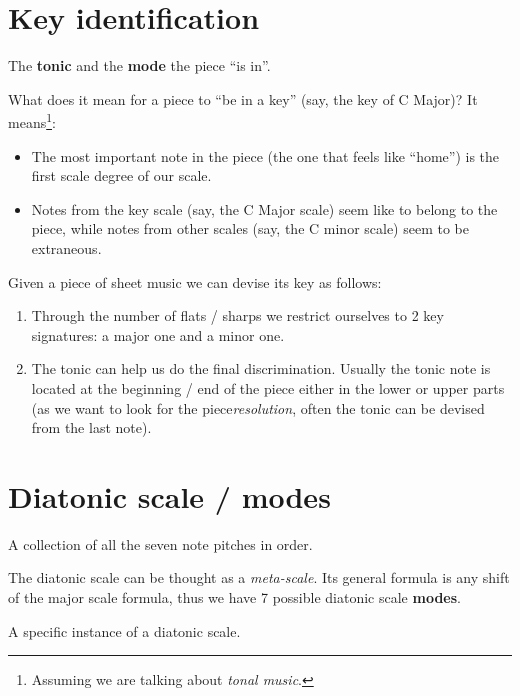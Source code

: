 \section{Key identification}
\begin{definition}
    The \textbf{tonic} and the \textbf{mode} the piece ``is in''.
\end{definition}

What does it mean for a piece to ``be in a key'' (say, the key of C Major)? It means\footnote{Assuming we are talking about \emph{tonal music}.}:
\begin{itemize}
    \item The most important note in the piece (the one that feels like ``home'') is the first scale degree of our scale.
    \item Notes from the key scale (say, the C Major scale) seem like to belong to the piece, while notes from other scales (say, the C minor scale) seem to be extraneous.
\end{itemize}

Given a piece of sheet music we can devise its key as follows:
\begin{enumerate}
    \item Through the number of flats / sharps we restrict ourselves to 2 key signatures: a major one and a minor one.
    \item The tonic can help us do the final discrimination. Usually the tonic note is located at the beginning / end of the piece either in the lower or upper parts (as we want to look for the piece\emph{resolution}, often the tonic can be devised from the last note).
\end{enumerate}

\section{Diatonic scale / modes}
\begin{definition}
    A collection of all the seven note pitches in order.
\end{definition}

The diatonic scale can be thought as a \emph{meta-scale}. Its general formula is any shift of the major scale formula, thus we have 7 possible diatonic scale \textbf{modes}.

\begin{definition}
    A specific instance of a diatonic scale.
\end{definition}

